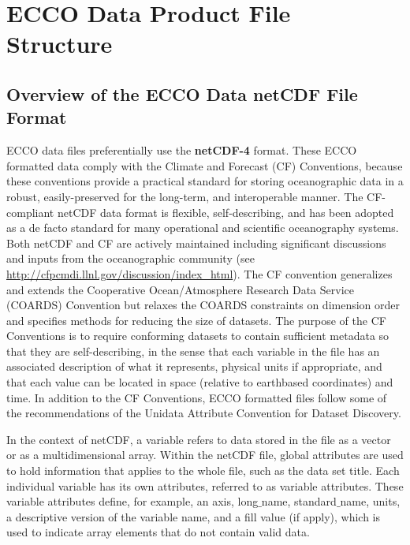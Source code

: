 \pagebreak

\section{ECCO Data Product File Structure}
\subsection{Overview of the ECCO Data netCDF File Format}

ECCO data files preferentially use the \textbf{netCDF-4} format. These ECCO formatted data comply with the Climate and Forecast (CF) Conventions, because these conventions provide a practical standard for storing oceanographic data in a robust, easily-preserved for the long-term, and interoperable manner. The CF-compliant netCDF data format is flexible, self-describing, and has been adopted as a de facto standard for many operational and scientific oceanography systems. Both netCDF and CF are actively maintained
including significant discussions and inputs from the oceanographic community (see \url{http://cfpcmdi.llnl.gov/discussion/index_html}). 
The CF convention generalizes and extends the Cooperative Ocean/Atmosphere Research Data Service (COARDS) Convention but relaxes the COARDS constraints on dimension order and specifies methods for reducing the size of datasets. The purpose
of the CF Conventions is to require conforming datasets to contain sufficient metadata so that they are
self-describing, in the sense that each variable in the file has an associated description of what it
represents, physical units if appropriate, and that each value can be located in space (relative to earthbased coordinates) and time. In addition to the CF Conventions, ECCO formatted files follow some of the recommendations of the Unidata Attribute Convention for Dataset Discovery. \par \vspace{0.1in}

In the context of netCDF, a variable refers to data stored in the file as a vector or as a
multidimensional array. Within the netCDF file, global attributes are used to hold information that applies to the whole file, such
as the data set title. Each individual variable has its own attributes, referred to as variable attributes. These variable attributes define, for example, an axis, long$\_$name, standard$\_$name, units, a descriptive version of the variable name, and a fill value (if apply), which is used to indicate array elements that do not
contain valid data.

